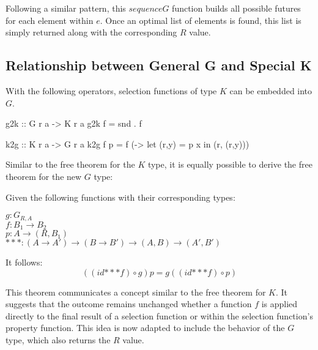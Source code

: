 \documentclass[runningheads]{llncs}
\newenvironment{reasoning}{\begin{adjustwidth}{0.2in}{}\noindent}{\end{adjustwidth}}
\newcommand{\ignore}[1]{}
\begin{document}
Following a similar pattern, this \(sequenceG\) function builds all
possible futures for each element within \(e\). Once an optimal list of
elements is found, this list is simply returned along with the
corresponding \(R\) value.

\subsection{Relationship between General G and Special
K}\label{relationship-between-general-g-and-special-k}

With the following operators, selection functions of type \(K\) can be
embedded into \(G\).

\ignore{

> g2k :: forall r a b. ((a -> (r,b)) -> (r,b)) -> ((a -> (r,b)) -> b)
> g2k f = snd . f

}

\begin{haskell}
g2k :: G r a -> K r a 
g2k f = snd . f
\end{haskell}

\begin{code}
k2g :: K r a -> G r a
k2g f p = f (\x -> let (r,y) = p x in (r, (r,y)))
\end{code}

Similar to the free theorem for the \(K\) type, it is equally possible
to derive the free theorem \cite{wadler1989theorems} for the new \(G\)
type:

\begin{theorem}
Given the following functions with their corresponding types:
\begin{reasoning}
  $g : G_{R,A}$\\
  $f : B_1 \rightarrow B_2$\\
  $p : A \rightarrow (R, B_1)$\\
  $\mathbin{{*}{*}{*}} : (A \rightarrow A') \rightarrow (B \rightarrow B') \rightarrow (A,B) \rightarrow (A',B')$\\
\end{reasoning}
It follows:
\[((id \mathbin{{*}{*}{*}} f) \circ g) p = g ((id \mathbin{{*}{*}{*}} f) \circ p)\]
\end{theorem}

This theorem communicates a concept similar to the free theorem for
\(K\). It suggests that the outcome remains unchanged whether a function
\(f\) is applied directly to the final result of a selection function or
within the selection function's property function. This idea is now
adapted to include the behavior of the \(G\) type, which also returns
the \(R\) value.
\end{document}
